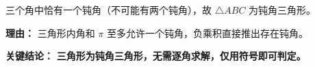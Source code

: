 \begin{examplebox}
\begin{description}[style=nextline, leftmargin=2.8em, labelsep=0.5em, itemsep=0.45em]
    \item[\textbf{第三步（形状判定）：}] 三个角中恰有一个钝角（不可能有两个钝角），故 $\triangle ABC$ 为钝角三角形。
    \par\textbf{理由：}
    三角形内角和 $\pi$ 至多允许一个钝角，负乘积直接推出存在钝角。
\end{description}

\textbf{\textcolor{CExample}{关键结论：}} \textbf{三角形为钝角三角形，无需逐角求解，仅用符号即可判定。}
\end{examplebox}

